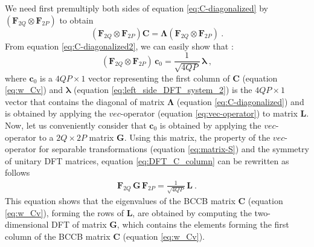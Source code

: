 \documentclass[manuscript,revised]{geophysics}
\begin{document}
We need first premultiply both sides of equation \ref{eq:C-diagonalized}
by $\left(\mathbf{F}_{2Q} \otimes \mathbf{F}_{2P} \right)$ to obtain
\begin{equation}
\left(\mathbf{F}_{2Q} \otimes \mathbf{F}_{2P} \right) \mathbf{C} = 
\boldsymbol{\Lambda}
\left(\mathbf{F}_{2Q} \otimes \mathbf{F}_{2P} \right) \: .
\label{eq:C-diagonalized2}
\end{equation}
From equation \ref{eq:C-diagonalized2}, we can easily show that 
\citep[][ p. 77]{chan-jin2007}:
\begin{equation}
	\left(\mathbf{F}_{2Q} \otimes \mathbf{F}_{2P} \right) \, 
	\mathbf{c}_{0} = \frac{1}{\sqrt{4QP}} \, \boldsymbol{\lambda} \: ,
	\label{eq:DFT_C_column}
\end{equation}
where $\mathbf{c}_{0}$ is a $4QP \times 1$ vector representing the first column of 
$\mathbf{C}$ (equation \ref{eq:w_Cv}) and 
$\boldsymbol{\lambda}$ (equation \ref{eq:left_side_DFT_system_2}) is the $4QP \times 1$ 
vector that contains the diagonal of matrix $\boldsymbol{\Lambda}$ (equation \ref{eq:C-diagonalized}) 
and is obtained by applying the $vec$-operator (equation \ref{eq:vec-operator}) to matrix $\mathbf{L}$.
Now, let us conveniently consider that $\mathbf{c}_{0}$ is obtained by applying the $vec$-operator 
to a $2Q \times 2P$ matrix $\mathbf{G}$.
Using this matrix, the property of the $vec$-operator for separable transformations 
(equation \ref{eq:matrix-S}) and the symmetry of unitary DFT matrices, equation \ref{eq:DFT_C_column} 
can be rewritten as follows
\begin{eqnarray}
	\mathbf{F}_{2Q} \, \mathbf{G} \, \mathbf{F}_{2P} = 
	\frac{1}{\sqrt{4QP}} \, \mathbf{L} \: .
	\label{eq:DFT_C_column_2}
\end{eqnarray}
This equation shows that the eigenvalues of the BCCB matrix $\mathbf{C}$ 
(equation \ref{eq:w_Cv}), forming the rows of $\mathbf{L}$,
are obtained by computing the two-dimensional DFT of matrix $\mathbf{G}$,
which contains the elements forming the first column of the BCCB matrix 
$\mathbf{C}$ (equation \ref{eq:w_Cv}).






%


%

\newpage


\end{document}
